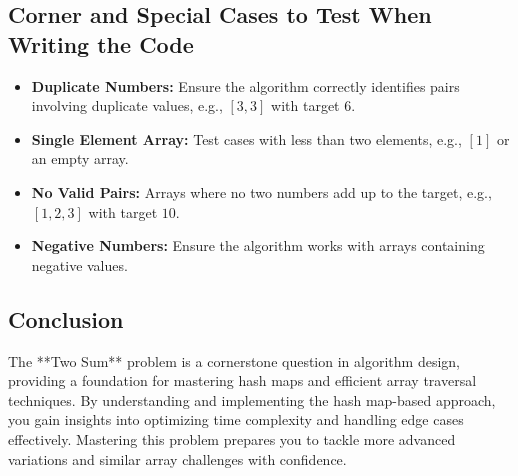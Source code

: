 \subsection*{Corner and Special Cases to Test When Writing the Code}
\begin{itemize}
    \item \textbf{Duplicate Numbers:} Ensure the algorithm correctly identifies pairs involving duplicate values, e.g., \( [3, 3] \) with target \( 6 \).
    \item \textbf{Single Element Array:} Test cases with less than two elements, e.g., \( [1] \) or an empty array.
    \item \textbf{No Valid Pairs:} Arrays where no two numbers add up to the target, e.g., \( [1, 2, 3] \) with target \( 10 \).
    \item \textbf{Negative Numbers:} Ensure the algorithm works with arrays containing negative values.
\end{itemize}

\subsection*{Conclusion}
The **Two Sum** problem is a cornerstone question in algorithm design, providing a foundation for mastering hash maps and efficient array traversal techniques. By understanding and implementing the hash map-based approach, you gain insights into optimizing time complexity and handling edge cases effectively. Mastering this problem prepares you to tackle more advanced variations and similar array challenges with confidence.